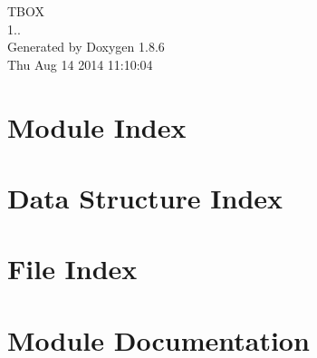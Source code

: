 \documentclass[twoside]{book}
\newcommand{\clearemptydoublepage}{%
  \newpage{\pagestyle{empty}\cleardoublepage}%
}
\begin{document}
\hypersetup{pageanchor=false}
\begin{titlepage}
\vspace*{7cm}
\begin{center}%
{\Large T\-B\-O\-X \\[1ex]\large 1.. }\\
\vspace*{1cm}
{\large Generated by Doxygen 1.8.6}\\
\vspace*{0.5cm}
{\small Thu Aug 14 2014 11:10:04}\\
\end{center}
\end{titlepage}
\clearemptydoublepage
\tableofcontents
\clearemptydoublepage
{}
\hypersetup{pageanchor=true}

\chapter{Module Index}

\chapter{Data Structure Index}

\chapter{File Index}

\chapter{Module Documentation}















\end{document}
